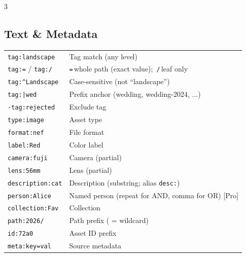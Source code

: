 \documentclass[a4paper,landscape,8pt]{article}
\newcommand{\cmd}[1]{\texttt{\footnotesize #1}}
\newcommand{\pro}{\textcolor{maki-teal}{\scriptsize [Pro]}}
\begin{document}
\begin{multicols}{3}
\subsection{Text \& Metadata}
\begin{tabularx}{\columnwidth}{@{}lX@{}}
\cmd{tag:landscape} & Tag match (any level) \\
\cmd{tag:=} / \cmd{tag:/} & \cmd{=}\,whole path (exact value);\, \cmd{/}\,leaf only \\
\cmd{tag:\textasciicircum Landscape} & Case-sensitive (not ``landscape'') \\
\cmd{tag:|wed} & Prefix anchor (wedding, wedding-2024, ...) \\
\cmd{-tag:rejected} & Exclude tag \\
\cmd{type:image} & Asset type \\
\cmd{format:nef} & File format \\
\cmd{label:Red} & Color label \\
\cmd{camera:fuji} & Camera (partial) \\
\cmd{lens:56mm} & Lens (partial) \\
\cmd{description:cat} & Description (substring; alias \cmd{desc:}) \\
\cmd{person:Alice} & Named person (repeat for AND, comma for OR) \pro \\
\cmd{collection:Fav} & Collection \\
\cmd{path:2026/} & Path prefix (\cmd{*} = wildcard) \\
\cmd{id:72a0} & Asset ID prefix \\
\cmd{meta:key=val} & Source metadata \\
\end{tabularx}


\end{multicols}
\end{document}

